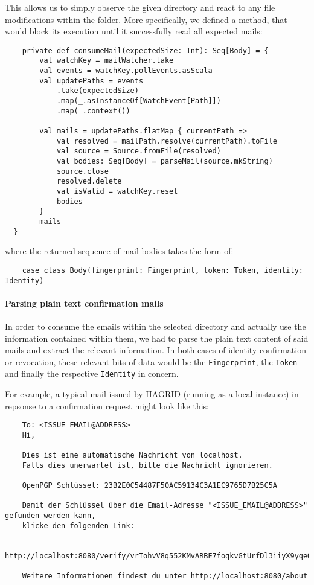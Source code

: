 This allows us to simply observe the given directory and react to any file modifications within the folder.
More specifically, we defined a method, that would block its execution until it successfully read all expected mails: 
\label{code:consumeMail}
\begin{verbatim}
    private def consumeMail(expectedSize: Int): Seq[Body] = {
        val watchKey = mailWatcher.take
        val events = watchKey.pollEvents.asScala
        val updatePaths = events
            .take(expectedSize)
            .map(_.asInstanceOf[WatchEvent[Path]])
            .map(_.context())

        val mails = updatePaths.flatMap { currentPath =>
            val resolved = mailPath.resolve(currentPath).toFile
            val source = Source.fromFile(resolved)
            val bodies: Seq[Body] = parseMail(source.mkString)
            source.close
            resolved.delete
            val isValid = watchKey.reset
            bodies
        }
        mails
  }
\end{verbatim}
where the returned sequence of mail bodies takes the form of:
\begin{verbatim}
    case class Body(fingerprint: Fingerprint, token: Token, identity: Identity)
\end{verbatim}

\paragraph{Parsing plain text confirmation mails}
In order to consume the emails within the selected directory and actually use the information contained within them, we had to parse the plain text content of said mails and extract the relevant information. In both cases of identity confirmation or revocation, these relevant bits of data would be the \texttt{Fingerprint}, the \texttt{Token} and finally the respective \texttt{Identity} in concern.

For example, a typical mail issued by HAGRID (running as a local instance) in repsonse to a confirmation request might look like this: 
\begin{verbatim}
    To: <ISSUE_EMAIL@ADDRESS> 
    Hi,
   
    Dies ist eine automatische Nachricht von localhost.
    Falls dies unerwartet ist, bitte die Nachricht ignorieren.
   
    OpenPGP Schlüssel: 23B2E0C54487F50AC59134C3A1EC9765D7B25C5A 
   
    Damit der Schlüssel über die Email-Adresse "<ISSUE_EMAIL@ADDRESS>" gefunden werden kann,
    klicke den folgenden Link:
   
    http://localhost:8080/verify/vrTohvV8q552KMvARBE7foqkvGtUrfDl3iiyX9yqeOX 
   
    Weitere Informationen findest du unter http://localhost:8080/about

\end{verbatim}

